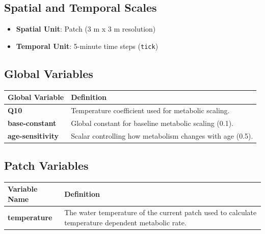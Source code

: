\documentclass[
]{book}
\providecommand{\tightlist}{%
  \setlength{\itemsep}{0pt}\setlength{\parskip}{0pt}}
\begin{document}
\subsection{Spatial and Temporal Scales}\label{spatial-and-temporal-scales}

\begin{itemize}
\tightlist
\item
  \textbf{Spatial Unit}: Patch (3 m x 3 m resolution)
\item
  \textbf{Temporal Unit}: 5-minute time steps (\texttt{tick})
\end{itemize}

\subsection{Global Variables}\label{global-variables}

\begin{longtable}[]{@{}
  >{\raggedright\arraybackslash}p{}
  >{\raggedright\arraybackslash}p{}@{}}
\toprule\noalign{}
\begin{minipage}[b]{\linewidth}\raggedright
Global Variable
\end{minipage} & \begin{minipage}[b]{\linewidth}\raggedright
Definition
\end{minipage} \\
\midrule\noalign{}
\endhead
\bottomrule\noalign{}
\endlastfoot
\textbf{Q10} & Temperature coefficient used for metabolic scaling. \\
\textbf{base-constant} & Global constant for baseline metabolic scaling (0.1). \\
\textbf{age-sensitivity} & Scalar controlling how metabolism changes with age (0.5). \\
\end{longtable}

\subsection{Patch Variables}\label{patch-variables}

\begin{longtable}[]{@{}
  >{\raggedright\arraybackslash}p{}
  >{\raggedright\arraybackslash}p{}@{}}
\toprule\noalign{}
\begin{minipage}[b]{\linewidth}\raggedright
Variable Name
\end{minipage} & \begin{minipage}[b]{\linewidth}\raggedright
Definition
\end{minipage} \\
\midrule\noalign{}
\endhead
\bottomrule\noalign{}
\endlastfoot
\textbf{temperature} & The water temperature of the current patch used to calculate temperature dependent metabolic rate. \\
\end{longtable}
\end{document}

